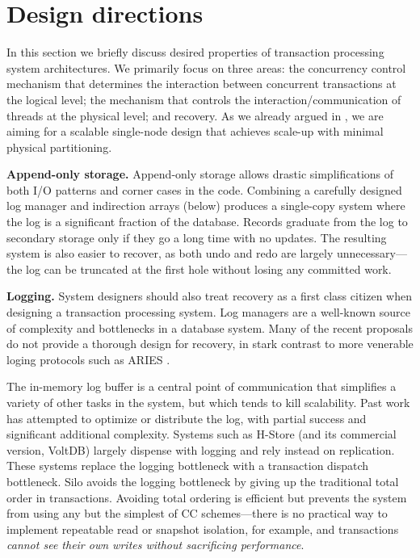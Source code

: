 \section{Design directions}

In this section we briefly discuss desired properties of transaction processing system architectures. We primarily focus on three areas: the concurrency control mechanism that determines the interaction between concurrent transactions at the logical level; the mechanism that controls the interaction/communication of threads at the physical level; and recovery. As we already argued in , we are aiming for a scalable single-node design that achieves scale-up with minimal physical partitioning.  

\vspace{2mm} 
{\bf Append-only storage.}
Append-only storage allows drastic simplifications of both I/O patterns and corner cases in the code. Combining a carefully designed log manager and indirection arrays (below) produces a single-copy system where the log is a significant fraction of the database. Records graduate from the log to secondary storage only if they go a long time with no updates. The resulting system is also easier to recover, as both undo and redo are largely unnecessary---the log can be truncated at the first hole without losing any committed work.

\vspace{2mm} 
{\bf Logging.}
System designers should also treat recovery as a first class citizen when designing a transaction processing system. Log managers are a well-known source of complexity and bottlenecks in a database system. Many of the recent proposals do not provide a thorough design for recovery, in stark contrast to more venerable loging protocols such as ARIES \cite{MohanHLPS92}.

The in-memory log buffer is a central point of communication that simplifies a variety of other tasks in the system, but which tends to kill scalability. Past work has attempted to optimize \cite{JohnsonPSAA10} or distribute \cite{WangJ14} the log, with partial success and significant additional complexity. Systems such as H-Store \cite{Kallman+08} (and its commercial version, VoltDB) largely dispense with logging and rely instead on replication. These systems replace the logging bottleneck with a transaction dispatch bottleneck. Silo avoids the logging bottleneck by giving up the traditional total order in transactions. Avoiding total ordering is efficient but prevents the system from using any but the simplest of CC schemes---there is no practical way to implement repeatable read or snapshot isolation, for example, and transactions {\it cannot see their own writes without sacrificing performance}.

